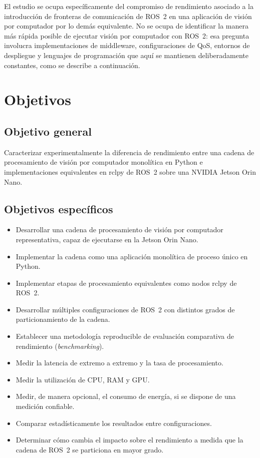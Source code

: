 El estudio se ocupa específicamente del compromiso de rendimiento asociado
a la introducción de fronteras de comunicación de ROS~2 en una aplicación
de visión por computador por lo demás equivalente. No se ocupa de identificar
la manera más rápida posible de ejecutar visión por computador con ROS~2:
esa pregunta involucra implementaciones de middleware, configuraciones de
QoS, entornos de despliegue y lenguajes de programación que aquí se
mantienen deliberadamente constantes, como se describe a continuación.

\section{Objetivos}
\label{sec:objectives}

\subsection{Objetivo general}

Caracterizar experimentalmente la diferencia de rendimiento entre una cadena
de procesamiento de visión por computador monolítica en Python e
implementaciones equivalentes en rclpy de ROS~2 sobre una NVIDIA Jetson
Orin Nano.

\subsection{Objetivos específicos}

\begin{itemize}
  \item Desarrollar una cadena de procesamiento de visión por computador
        representativa, capaz de ejecutarse en la Jetson Orin Nano.
  \item Implementar la cadena como una aplicación monolítica de proceso
        único en Python.
  \item Implementar etapas de procesamiento equivalentes como nodos rclpy
        de ROS~2.
  \item Desarrollar múltiples configuraciones de ROS~2 con distintos grados
        de particionamiento de la cadena.
  \item Establecer una metodología reproducible de evaluación comparativa
        de rendimiento (\emph{benchmarking}).
  \item Medir la latencia de extremo a extremo y la tasa de procesamiento.
  \item Medir la utilización de CPU, RAM y GPU.
  \item Medir, de manera opcional, el consumo de energía, si se dispone de
        una medición confiable.
  \item Comparar estadísticamente los resultados entre configuraciones.
  \item Determinar cómo cambia el impacto sobre el rendimiento a medida que
        la cadena de ROS~2 se particiona en mayor grado.
\end{itemize}

